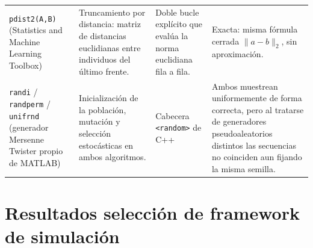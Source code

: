 \begin{table}
\begin{tabular}{p{2.9cm}p{2.6cm}p{3.5cm}p{4cm}}
\texttt{pdist2(A,B)} (Statistics and Machine Learning Toolbox) & Truncamiento por distancia: matriz de distancias euclidianas entre individuos del último frente. & Doble bucle explícito que evalúa la norma euclidiana fila a fila. & Exacta: misma fórmula cerrada $\|a-b\|_2$, sin aproximación. \\
\texttt{randi} / \texttt{randperm} / \texttt{unifrnd} (generador Mersenne Twister propio de MATLAB) & Inicialización de la población, mutación y selección estocásticas en ambos algoritmos. & Cabecera \texttt{<random>} de C++ & Ambos muestrean uniformemente de forma correcta, pero al tratarse de generadores pseudoaleatorios distintos las secuencias no coinciden aun fijando la misma semilla. \\
\hline
\end{tabular}
\end{table}

\section{Resultados selección de framework de simulación}

